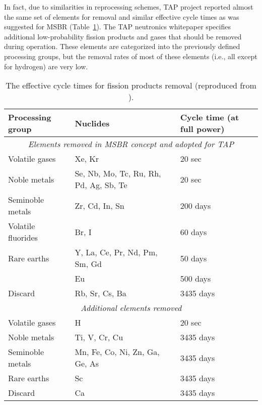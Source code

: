In fact, due to similarities in reprocessing schemes, \gls{TAP} project reported almost 
the same set of elements for removal and similar effective cycle times as was suggested 
for \gls{MSBR} (Table~\ref{tab:reprocessing_list}). The \gls{TAP} neutronics whitepaper 
specifies additional low-probability fission products and gases that should be 
removed during operation. These elements are categorized into the previously 
defined processing groups, but the removal rates of most of these elements 
(i.e., all except for hydrogen) are very low.
\begin{table}[ht!]
        \centering
        \caption{The effective cycle times for fission products removal (reproduced from \cite{betzler_implementation_2017}).}
        \begin{tabular}{p{} p{} p{}}
        \hline 
        Processing group & \qquad\qquad\qquad Nuclides & Cycle time (at full power) \\ [5pt] \hline 
 \multicolumn{3}{c}{\textit{Elements removed in \gls{MSBR} concept and adopted for \gls{TAP}} \cite{robertson_conceptual_1971, rykhlevskii_modeling_2019}} \\
        Volatile gases & Xe, Kr								  & 20 sec \\ [5pt]
        Noble metals & Se, Nb, Mo, Tc, Ru, Rh, Pd, Ag, Sb, Te & 20 sec \\ [5pt]
        Seminoble metals & Zr, Cd, In, Sn	  				  & 200 days \\ [5pt]
        Volatile fluorides & Br, I 							  & 60 days \\ [5pt]
        Rare earths & Y, La, Ce, Pr, Nd, Pm, Sm, Gd & 50 days \\ [5pt]
        \qquad & Eu & 500 days \\ [5pt]
        Discard & Rb, Sr, Cs, Ba & 3435 days \\ [5pt] 
        \hline
 
 \multicolumn{3}{c}{\textit{Additional elements removed} \cite{transatomic_power_corporation_neutronics_2016}  } \\
        Volatile gases & H								  		& 20 sec    \\ [5pt]
        Noble metals & Ti, V, Cr, Cu						    & 3435 days \\ [5pt]
        Seminoble metals & Mn, Fe, Co, Ni, Zn, Ga, Ge, As       & 3435 days \\ [5pt]
        Rare earths & Sc										& 3435 days \\ [5pt]
        Discard & Ca											& 3435 days \\ [5pt] 
        \hline
        \end{tabular}
        \label{tab:reprocessing_list}
          \vspace{-0.9em}
\end{table}

